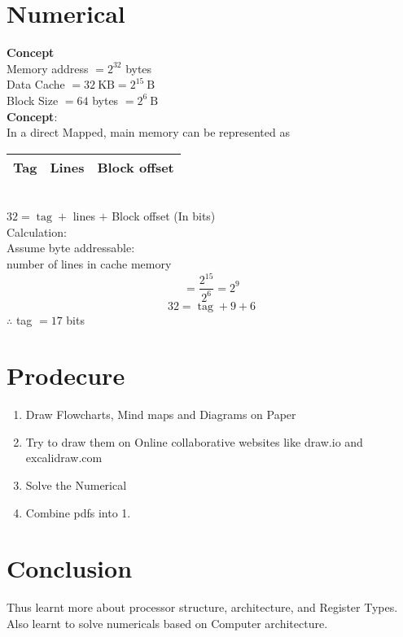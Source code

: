 \documentclass[11pt]{article}
\begin{document}
\section{Numerical}

\textbf{Concept}\\
Memory address $=2^{32}$ bytes\\
Data Cache $=32 \mathrm{~KB}=2^{15} \mathrm{~B}$\\
Block Size $=64$ bytes $=2^6 \mathrm{~B}$\\
\textbf{Concept}:\\
In a direct Mapped, main memory can be represented as\\
\begin{tabular}{|l|l|l|}
\hline Tag & Lines & Block offset \\
\hline
\end{tabular}\\
$32=\operatorname{tag}+$ lines $+$ Block offset (In bits)\\
Calculation:\\
Assume byte addressable:\\
number of lines in cache memory\\
$$=\frac{2^{15}}{2^6}=2^9$$
$$32=\operatorname{tag}+9+6$$
$\therefore$ tag $=17$
bits

\section{Prodecure}
\begin{enumerate}
	\item Draw Flowcharts, Mind maps and Diagrams on Paper
	\item Try to draw them on Online collaborative websites like draw.io and excalidraw.com
	\item Solve the Numerical
	\item Combine pdfs into 1.
\end{enumerate}


\section{Conclusion}
Thus learnt more about processor structure, architecture, and Register Types. Also learnt to solve numericals based on Computer architecture.
\end{document}
